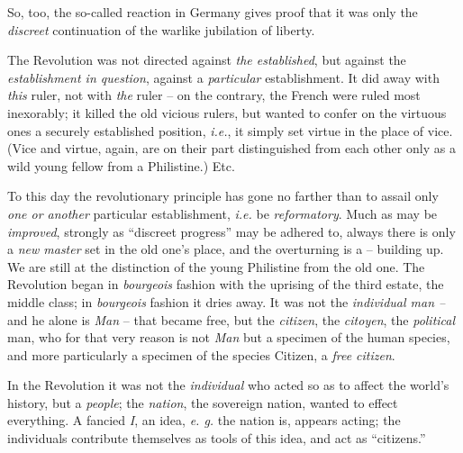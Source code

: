 \documentclass[12pt,a4paper]{book}
\begin{document}
So, too, the so-called reaction in Germany gives proof that it was only the 
\textit{discreet} continuation of the warlike jubilation of liberty.

The Revolution was not directed against \textit{the established}, but against 
the \textit{establishment in question}, against a \textit{particular} 
establishment. It did away with \textit{this} ruler, not with \textit{the} 
ruler -- on the contrary, the French were ruled most inexorably; it killed the 
old vicious rulers, but wanted to confer on the virtuous ones a securely 
established position, \textit{i.e.}, it simply set virtue in the place of 
vice. (Vice and virtue, again, are on their part distinguished from each other 
only as a wild young fellow from a Philistine.) Etc.

To this day the revolutionary principle has gone no farther than to assail 
only \textit{one or another} particular establishment, \textit{i.e.} be 
\textit{reformatory}. Much as may be \textit{improved}, strongly as 
``discreet progress'' may be adhered to, always there is only a \textit{new 
master} set in the old one's place, and the overturning is a -- building up. 
We are still at the distinction of the young Philistine from the old one. The 
Revolution began in \textit{bourgeois} fashion with the uprising of the third 
estate, the middle class; in \textit{bourgeois} fashion it dries away. It was 
not the \textit{individual man --} and he alone is \textit{Man} -- that became 
free, but the \textit{citizen}, the \textit{citoyen}, the \textit{political} 
man, who for that very reason is not \textit{Man} but a specimen of the human 
species, and more particularly a specimen of the species Citizen, a 
\textit{free citizen}.

In the Revolution it was not the \textit{individual} who acted so as to affect 
the world's history, but a \textit{people}; the \textit{nation}, the sovereign 
nation, wanted to effect everything. A fancied \textit{I}, an idea, \textit{e. 
g.} the nation is, appears acting; the individuals contribute themselves as 
tools of this idea, and act as ``citizens.''
\end{document}
